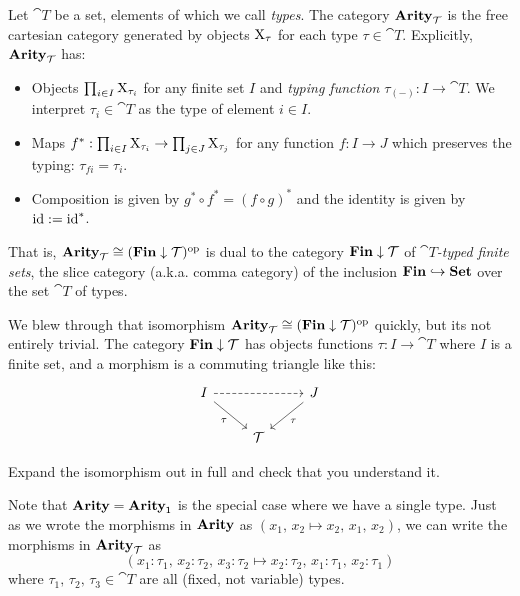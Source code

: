 \documentclass[DynamicalBook]{subfiles}
\begin{document}
\begin{definition}
  Let $\cat{T}$ be a set, elements of which we call \emph{types}. The category $\textbf{Arity}_{\mathcal{T}}$ is the
  free cartesian category generated by objects $\mathrm{X}_{\tau}$ for each type $\tau
  \in \cat{T}$. Explicitly, $\textbf{Arity}_{\mathcal{T}}$ has:
  \begin{itemize}
    \item Objects $\prod_{i \in I} \mathrm{X}_{\tau_i}$ for any finite set $I$ and
      \emph{typing function}
      $\tau_{(-)} : I \to \cat{T}$. We interpret $\tau_i \in \cat{T}$ as the
      type of element $i \in I$.
    \item Maps $f^{\ast} : \prod_{i \in I} \mathrm{X}_{\tau_i} \to
      \prod_{j \in J} \mathrm{X}_{\tau_j}$ for any function $f : I \to J$ which
      preserves the typing: $\tau_{fi} = \tau_i$.
    \item Composition is given by $g^{\ast} \circ f^{\ast} = (f \circ g)^{\ast}$
      and the identity is given by $\mathrm{id} := \mathrm{id}^{\ast}$. 
  \end{itemize}
  That is, $\textbf{Arity}_{\mathcal{T}} \cong (\textbf{Fin} \downarrow \mathcal{T})^{\textnormal{op}}$ is dual to
  the category
  $\textbf{Fin} \downarrow \mathcal{T}$ of \emph{$\cat{T}$-typed finite sets}, the slice category (a.k.a. comma category)
  of the inclusion $\textbf{Fin} \hookrightarrow \textbf{Set}$ over the set $\cat{T}$
  of types. 
\end{definition}

\begin{exercise}
  We blew through that isomorphism $\textbf{Arity}_{\mathcal{T}} \cong (\textbf{Fin} \downarrow
  \mathcal{T})^{\textnormal{op}}$ quickly, but its not entirely trivial. The category $\textbf{Fin} \downarrow
  \mathcal{T}$ has objects functions $\tau : I \to \cat{T}$ where $I$ is a finite
  set, and a morphism is a commuting triangle like this:
  \[
    \begin{tikzcd}
      I \ar[rr, dashed] \ar[dr, "\tau"'] & & J \ar[dl, "\tau"] \\
      & \cat{T} &
    \end{tikzcd}
  \]


  Expand the isomorphism out in full and check
  that you understand it.
\end{exercise}

Note that $\textbf{Arity} = \textbf{Arity}_{\mathsf{1}}$ is the special case where we have a single
type. Just as we wrote the morphisms in $\textbf{Arity}$ as $(x_1,\, x_2 \mapsto x_2,\,
x_1,\, x_2)$, we can write the morphisms in $\textbf{Arity}_{\mathcal{T}}$ as
$$(x_1 : \tau_1,\, x_2 : \tau_2,\, x_3 : \tau_2 \mapsto x_2 : \tau_2,\, x_1 :
\tau_1,\, x_2 : \tau_1)$$
where $\tau_1,\, \tau_2,\, \tau_3 \in \cat{T}$ are all (fixed, not variable) types.
\end{document}
